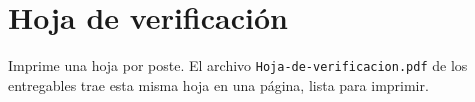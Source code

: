 \chapter{Hoja de verificación}\label{anx:hoja}

Imprime una hoja por poste. El archivo \texttt{Hoja-de-verificacion.pdf} de los entregables trae esta misma hoja en una página, lista para imprimir.

\newpage
\thispagestyle{empty}
{\small}
